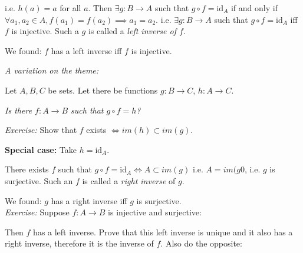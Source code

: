 \documentclass[twoside]{scrartcl}
\begin{document}
i.e. $h(a) = a$ for all $a$. Then $\exists g : B\to A$ such that $g \circ f = \text{id}_A$ if and only if $\forall a_1,a_2 \in A, f(a_1) = f(a_2) \implies a_1 = a_2$. i.e. $\exists g: B\to A$ such that $g \circ f = \text{id}_A$ iff $f$ is injective. Such a $g$ is called a \emph{left inverse of $f$}. 

We found: $f$ has a left inverse iff $f$ is injective. 

\emph{A variation on the theme:}

Let $A, B, C$ be sets. Let there be functions $g: B \to C$, $h: A \to C$. 

\begin{center}
\end{center}


\emph{Is there $f:A \to B$ such that $g \circ f = h$?}

\emph{Exercise:} Show that $f$ exists $\iff im(h) \subset im(g)$. 

\textbf{Special case:} Take $h =\text{id}_A$. 

\begin{center}
\end{center}

There exists $f$ such that $g \circ f = \text{id}_A \iff A \subset im(g)$ i.e. $A = im(g0$, i.e. $g$ is surjective. Such an $f$ is called a \emph{right inverse} of $g$. 

We found: $g$ has a right inverse iff $g$ is surjective.\\



\emph{Exercise:} Suppose $f: A \to B$ is injective and surjective:

 Then $f$ has a left inverse. Prove that this left inverse is unique and it also has a right inverse, therefore it is the inverse of $f$. Also do the opposite: 
\end{document}
